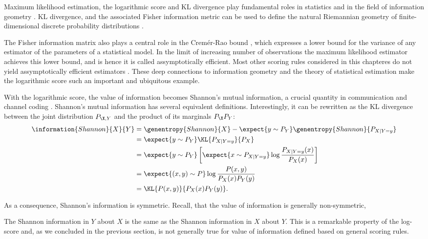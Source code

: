 \cbstart Maximum likelihood estimation, the logarithmic score and KL divergence play fundamental roles in statistics and in the field of information geometry \citep{Amari00}. KL divergence, and the associated Fisher information metric can be used to define the natural Riemannian geometry of finite-dimensional discrete probability distributions \cite{Amari00}.

The Fisher information matrix also plays a central role in the Crem\'{e}r-Rao bound \citep{Cremer99}, which expresses a lower bound for the variance of any estimator of the parameters of a statistical model. In the limit of increasing number of observations the maximum likelihood estimator achieves this lower bound, and is hence it is called assymptotically efficient. Most other scoring rules considered in this chapteres do not yield assymptotically efficient estimators \citep[see \eg][]{Varin11}. These deep connections to information geometry and the theory of statistical estimation make the logarithmic score such an important and ubiquitous example.
\cbend

With the logarithmic score, the value of information becomes Shannon's mutual information, a crucial quantity in communication and channel coding \citep{Shannon1948, MacKay2002}. Shannon's mutual information has several equivalent definitions. Interestingly, it can be rewritten as the KL divergence between the joint distribution $P_{\X,Y}$ and the product of its marginals $P_{\X}P_{Y}$:
%
\begin{align}
	\information{Shannon}{X}{Y} &= \genentropy{Shannon}{X} - \expect{y \sim P_{Y}} \genentropy{Shannon}{P_{X\vert Y=y}}\\
		&= \expect{y \sim P_{Y}}\KL{P_{X\vert Y=y}}{P_X}\\
		&= \expect{y \sim P_{Y}}\left[\expect{x \sim P_{X\vert Y=y}} \log\frac{P_{X\vert Y=y}(x)}{P_X(x)} \right]\\
		&= \expect{(x,y) \sim P} \log \frac{P(x,y)}{P_{X}(x)P_{Y}(y)}\\
		&= \KL{P(x,y)}{P_{X}(x)P_{Y}(y)}.\label{eqn:mutualinfo_as_KLdivergence}
\end{align}

As a consequence, Shannon's information is symmetric. Recall, that the value of information is generally non-symmetric, 

The Shannon information in $Y$ about $X$ is the same as the Shannon information in $X$ about $Y$. This is a remarkable property of the log-score and, as we concluded in the previous section, is not generally true for value of information defined based on general scoring rules.

